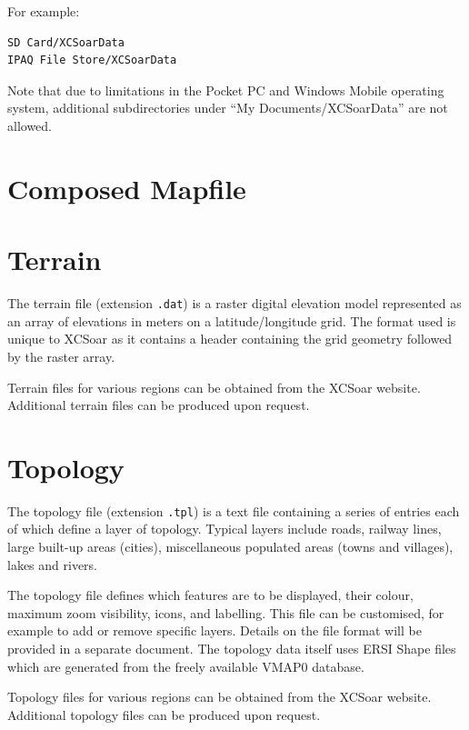 \documentclass[a4paper,12pt]{refrep}
\begin{document}
For example:
\begin{verbatim}
SD Card/XCSoarData
IPAQ File Store/XCSoarData
\end{verbatim}


Note that due to limitations in the Pocket PC and Windows Mobile
operating system, additional subdirectories under ``My
Documents/XCSoarData'' are not allowed.

\section{Composed Mapfile}


\section{Terrain}

The terrain file (extension \verb|.dat|) is a raster digital elevation
model represented as an array of elevations in meters on a
latitude/longitude grid.  The format used is unique to XCSoar as it
contains a header containing the grid geometry followed by the raster
array.

Terrain files for various regions can be obtained from the XCSoar website.
Additional terrain files can be produced upon request.

\section{Topology}

The topology file (extension \verb|.tpl|) is a text file containing a
series of entries each of which define a layer of topology.  Typical
layers include roads, railway lines, large built-up areas (cities),
miscellaneous populated areas (towns and villages), lakes and rivers.

The topology file defines which features are to be displayed, their
colour, maximum zoom visibility, icons, and labelling.  This file can
be customised, for example to add or remove specific layers.  Details
on the file format will be provided in a separate document.  The
topology data itself uses ERSI Shape files which are generated from the
freely available VMAP0 database.

Topology files for various regions can be obtained from the XCSoar
website.  Additional topology files can be produced upon request.
\end{document}
